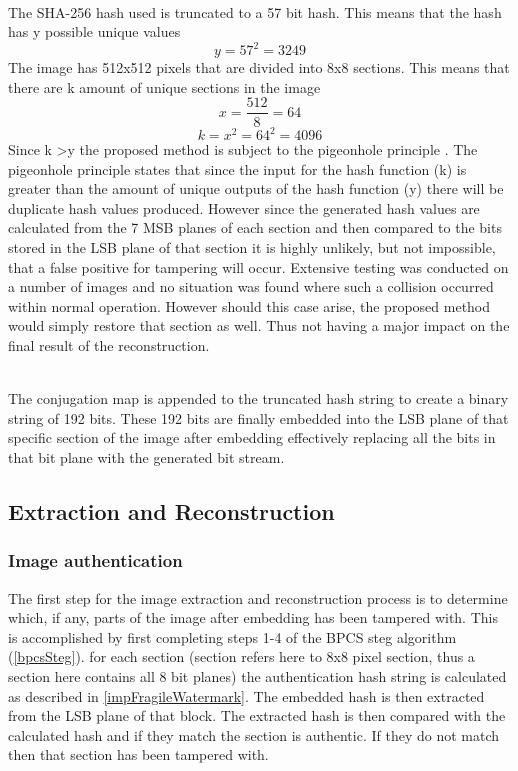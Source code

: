 \documentclass[12pt]{article}
\begin{document}
\hspace{0pt} \\
The SHA-256 hash used is truncated to a 57 bit hash. 
This means that the hash has y possible unique values 
\[ y = 57^2 = 3249 \]
The image has 512x512 pixels that are divided into 8x8 sections.
This means that there are k amount of unique sections in the image
\[x = \frac{512}{8} = 64 \]
\[k = x^2 =64^2 = 4096 \]
Since k \textgreater y the proposed method is subject to the pigeonhole principle \cite{cook1976short}.
The pigeonhole principle states that since the input for the hash function (k) is greater than the amount of unique outputs of the hash function (y) there will be duplicate hash values produced.
However since the generated hash values are calculated from the 7 MSB planes of each section and then compared to the bits stored in the LSB plane of that section it is highly unlikely, but not impossible, that a false positive for tampering will occur.
Extensive testing was conducted on a number of images and no situation was found where such a collision occurred within normal operation.
However should this case arise, the proposed method would simply restore that section as well.
Thus not having a major impact on the final result of the reconstruction.

\hspace{0pt} \\
The conjugation map is appended to the truncated hash string to create a binary string of 192 bits.
These 192 bits are finally embedded into the LSB plane of that specific section of the image after embedding effectively replacing all the bits in that bit plane with the generated bit stream.

\subsection{Extraction and Reconstruction}
\label{extractRestore}
\subsubsection{Image authentication}
The first step for the image extraction and reconstruction process is to determine which, if any, parts of the image after embedding has been tampered with.
This is accomplished by first completing steps 1-4 of the BPCS steg algorithm (\ref{bpcsSteg}).
for each section (section refers here to 8x8 pixel section, thus a section here contains all 8 bit planes) the authentication hash string is calculated as described in \ref{impFragileWatermark}. 
The embedded hash is then extracted from the LSB plane of that block.
The extracted hash is then compared with the calculated hash and if they match the section is authentic.
If they do not match then that section has been tampered with.
\end{document}
